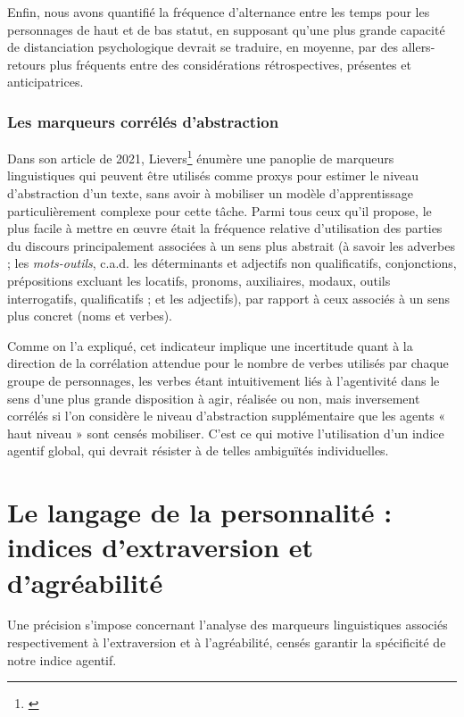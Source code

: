 Enfin, nous avons quantifié la fréquence d'alternance entre les temps pour les personnages de haut et de bas statut, en supposant qu'une plus grande capacité de distanciation psychologique devrait se traduire, en moyenne, par des allers-retours plus fréquents entre des considérations rétrospectives, présentes et anticipatrices.

\subsection{Les marqueurs corrélés d’abstraction}

Dans son article de 2021, Lievers\footnote{\cite{strik_lievers_linguistic_2021}} énumère une panoplie de marqueurs linguistiques qui peuvent être utilisés comme proxys pour estimer le niveau d'abstraction d'un texte, sans avoir à mobiliser un modèle d'apprentissage particulièrement complexe pour cette tâche. Parmi tous ceux qu'il propose, le plus facile à mettre en œuvre était la fréquence relative d'utilisation des parties du discours principalement associées à un sens plus abstrait (à savoir les adverbes ; les \textit{mots-outils}, c.a.d. les déterminants et adjectifs non qualificatifs, conjonctions, prépositions excluant les locatifs, pronoms, auxiliaires, modaux, outils interrogatifs, qualificatifs ; et les adjectifs), par rapport à ceux associés à un sens plus concret (noms et verbes). 

Comme on l’a expliqué, cet indicateur implique une incertitude quant à la direction de la corrélation attendue pour le nombre de verbes utilisés par chaque groupe de personnages, les verbes étant intuitivement liés à l’agentivité dans le sens d’une plus grande disposition à agir, réalisée ou non, mais inversement corrélés si l'on considère le niveau d'abstraction supplémentaire que les agents « haut niveau » sont censés mobiliser. C'est ce qui motive l'utilisation d'un indice agentif global, qui devrait résister à de telles ambiguïtés individuelles.

\chapter{Le langage de la personnalité : indices d’extraversion et d’agréabilité}

Une précision s'impose concernant l'analyse des marqueurs linguistiques associés respectivement à l'extraversion et à l'agréabilité, censés garantir la spécificité de notre indice agentif. 

